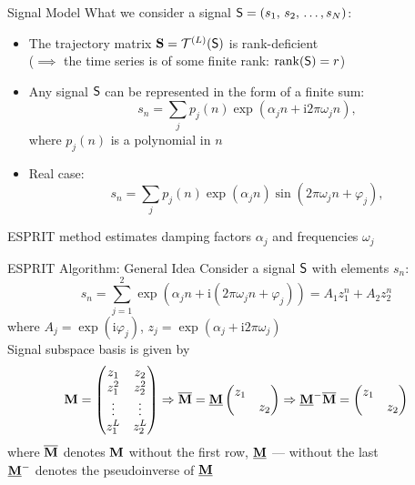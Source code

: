 \documentclass[pdf, unicode, ucs, notheorems]{beamer}
\theoremstyle{definition}
\begin{document}
\begin{frame}{Signal Model}
  What we consider a signal $\mathsf{S} = (s_1,\, s_2,\, \ldots, s_N)$:\smallskip
  \begin{itemize}
    \item The trajectory matrix $\mathbf{S} = \mathcal{T}^{(L)}(\mathsf{S})$ is rank-deficient \\
      ($\implies$ the time series is of some finite rank:
      $\operatorname{rank}(\mathsf{S})=r$)
      \medskip
    \item Any signal $\mathsf{S}$ can be represented in the form of a finite sum:
      \[
        s_n = \sum_{j} p_j(n) \exp(\alpha_j n + \mathrm{i}2\pi
        \omega_j n),
      \]
      where $p_j(n)$ is a polynomial in $n$
      \medskip
    \item Real case:
      \[
        s_n = \sum_{j} p_j(n) \exp(\alpha_j n)\sin(2\pi
        \omega_j n + \varphi_j),
      \]
  \end{itemize}
  \bigskip
  ESPRIT method estimates damping factors $\alpha_j$ and
  frequencies $\omega_j$
\end{frame}

\begin{frame}{ESPRIT Algorithm: General Idea}
  Consider a signal $\mathsf{S}$ with elements $s_n$:
  \[
    s_n = \sum_{j=1}^{2} \exp(\alpha_j n + \mathrm{i}(2\pi
    \omega_j n + \varphi_j)) = A_1 z_1^n + A_2 z_2^n
  \]
  where $A_j = \exp(\mathrm{i} \varphi_j)$, $z_j = \exp(\alpha_j +
  \mathrm{i}2\pi\omega_j)$ \vspace{0.4cm}\\
  Signal subspace basis is given by
  \[
    \mathbf{M} =
    \begin{pmatrix}
      z_1 & z_2 \\
      z_1^2 & z_2^2\\
      \vdots & \vdots \\
      z_1^L & z_2^L
    \end{pmatrix} \Rightarrow \overline{\mathbf{M}} = \underline{\mathbf{M}}
    \begin{pmatrix}
      z_1 & \\ & z_2
    \end{pmatrix}\Rightarrow  \underline{\mathbf{M}}^{-}\overline{\mathbf{M}} =
    \begin{pmatrix}
      z_1 & \\ & z_2
    \end{pmatrix}
  \]
  where $\overline{\mathbf{M}}$ denotes $\mathbf{M}$ without the first row,
  $\underline{\mathbf{M}}$ --- without the last\\
  $\underline{\mathbf{M}}^{-}$ denotes the pseudoinverse of $\underline{\mathbf{M}}$
\end{frame}
\end{document}
